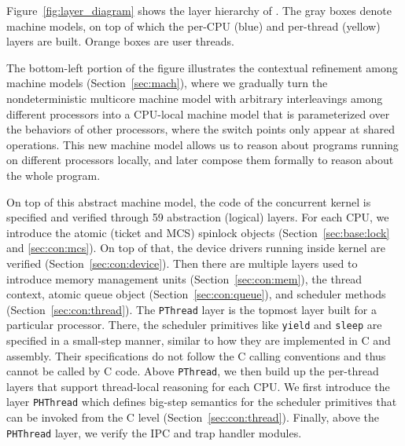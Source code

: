 
Figure~\ref{fig:layer_diagram} shows the layer hierarchy of  \cCTOS{}.
The gray boxes denote machine models, on top of which the
per-CPU (blue) and per-thread (yellow) layers are built. Orange boxes
are user threads.

The bottom-left portion of the figure illustrates the contextual refinement
among machine models (\cf Section~\ref{sec:mach}), where we gradually turn the nondeterministic
multicore machine model with arbitrary interleavings
among different processors into a CPU-local machine model that is parameterized
over the behaviors of other processors,
where the switch points only appear at shared operations. This new machine
model allows us to reason about programs running on different processors locally,
and later compose them formally to reason about the whole program.

On top of this abstract machine model, the code of the concurrent kernel is specified and 
verified through 59 abstraction (logical) layers. For each CPU,
we introduce the atomic (ticket and MCS) spinlock objects
(\cf Section~\ref{sec:base:lock} and \ref{sec:con:mcs}).
On top of that, the device drivers running inside kernel are verified
(\cf Section~\ref{sec:con:device}).
Then there are multiple layers used to introduce memory management units (\cf Section~\ref{sec:con:mem}),
the thread context, atomic queue object (\cf Section~\ref{sec:con:queue}), and scheduler methods (\cf Section~\ref{sec:con:thread}).
The \texttt{PThread} layer is the topmost layer built for a particular processor.
There, the scheduler primitives like \texttt{yield} and \texttt{sleep}
are specified in a small-step manner, similar to how they are implemented
in C and assembly. Their specifications do not follow the C calling conventions
and thus cannot be called by C code. Above \texttt{PThread}, we then build up the 
per-thread layers that support thread-local reasoning for each CPU.
We first introduce the layer \texttt{PHThread} which defines big-step semantics for
the scheduler primitives that can be invoked from the C level (\cf Section~\ref{sec:con:thread}).
Finally, above the \texttt{PHThread} layer, we verify the
IPC and trap handler modules.

